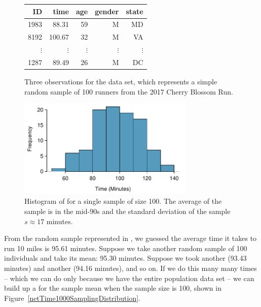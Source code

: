 \begin{figure}[h]
\centering
\begin{tabular}{rrrrr}
  \hline
ID & time & age & gender & state \\ 
  \hline
1983 & 88.31 & 59 & M & MD \\ 
8192 & 100.67 & 32 & M & VA \\ 
  $\vdots$ &   $\vdots$ &   $\vdots$ &   $\vdots$ &   $\vdots$ \\ 
1287 & 89.49 & 26 & M & DC \\ 
   \hline
\end{tabular}
\caption{Three observations for the  data set, which represents a simple random sample of 100 runners from the 2017 Cherry Blossom Run.}
\label{run17sampDF}
\end{figure}


\begin{figure}[h]
\centering
\includegraphics[width=0.75\textwidth]{ch_distributions/figures/run17sampHistograms/run17sampHistograms} 
\caption{Histogram of  for a single sample of size 100. The average of the sample is in the mid-90s and the standard deviation of the sample $s\approx 17$ minutes.
}
\label{run17sampHistograms}
\end{figure}

From the random sample represented in , we guessed the average time it takes to run 10 miles is 95.61 minutes. Suppose we take another random sample of 100 individuals and take its mean: 95.30 minutes. Suppose we took another (93.43 minutes) and another (94.16 minutes), and so on. If we do this many many times -- which we can do only because we have the entire population data set -- we can build up a  for the sample mean when the sample size is 100, shown in Figure~\ref{netTime1000SamplingDistribution}.

